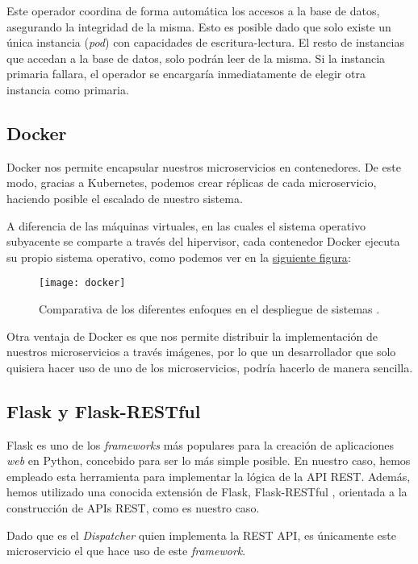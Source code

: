 Este operador coordina de forma automática los accesos a la base de datos, asegurando la integridad de la misma. Esto es posible dado que solo existe un única instancia (\emph{pod}) con capacidades de escritura-lectura. El resto de instancias que accedan a la base de datos, solo podrán leer de la misma. Si la instancia primaria fallara, el operador se encargaría inmediatamente de elegir otra instancia como primaria.


\subsection{Docker}

Docker nos permite encapsular nuestros microservicios en contenedores. De este modo, gracias a Kubernetes, podemos crear réplicas de cada microservicio, haciendo posible el escalado de nuestro sistema.

A diferencia de las máquinas virtuales, en las cuales el sistema operativo subyacente se comparte a través del hipervisor, cada contenedor Docker ejecuta su propio sistema operativo, como podemos ver en la \hyperref[fig:vm-container]{siguiente figura}:

\begin{figure}[!h]
	\centering
	\texttt{[image: docker]}
	\caption[Diferentes enfoques en el despliegue de sistemas \cite{kubernetes}.]{Comparativa de los diferentes enfoques en el despliegue de sistemas \cite{kubernetes}.}
	\label{fig:vm-container}
\end{figure}

Otra ventaja de Docker es que nos permite distribuir la implementación de nuestros microservicios a través imágenes, por lo que un desarrollador que solo quisiera hacer uso de uno de los microservicios, podría hacerlo de manera sencilla.


\subsection{Flask y Flask-RESTful}

Flask es uno de los \emph{frameworks} más populares para la creación de aplicaciones \emph{web} en Python\cite{flask}, concebido para ser lo más simple posible. En nuestro caso, hemos empleado esta herramienta para implementar la lógica de la API REST. Además, hemos utilizado una conocida extensión de Flask, Flask-RESTful \cite{flaskRestful}, orientada a la construcción de APIs REST, como es nuestro caso.

Dado que es el \emph{Dispatcher} quien implementa la REST API, es únicamente este microservicio el que hace uso de este \emph{framework}.


